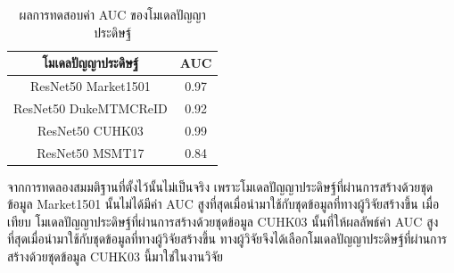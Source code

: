 \begin{table}[!ht]
    \centering
    \begin{tabular}{|c|c|}
            \hline
            {โมเดลปัญญาประดิษฐ์}&{AUC}											\\
            \hline
            ResNet50 Market1501	 		& 0.97 								\\
            ResNet50 DukeMTMCReID		& 0.92								\\
            ResNet50 CUHK03				& 0.99								\\
            ResNet50 MSMT17				& 0.84								\\
        \hline
    \end{tabular}
    \caption{ผลการทดสอบค่า AUC ของโมเดลปัญญาประดิษฐ์}
    \label{tab: AUC of model ReID}
\end{table}

จากการทดลองสมมติฐานที่ตั้งไว้นั้นไม่เป็นจริง เพราะโมเดลปัญญาประดิษฐ์ที่ผ่านการสร้างด้วยชุดข้อมูล Market1501 นั้นไม่ได้มีค่า AUC สูงที่สุดเมื่อนำมาใช้กับชุดข้อมูลที่ทางผู้วิจัยสร้างขึ้น เมื่อเทียบ โมเดลปัญญาประดิษฐ์ที่ผ่านการสร้างด้วยชุดข้อมูล CUHK03 นั้นที่ให้ผลลัพธ์ค่า AUC สูงที่สุดเมื่อนำมาใช้กับชุดข้อมูลที่ทางผู้วิจัยสร้างขึ้น ทางผู้วิจัยจึงได้เลือกโมเดลปัญญาประดิษฐ์ที่ผ่านการสร้างด้วยชุดข้อมูล CUHK03 นี้มาใช่ในงานวิจัย